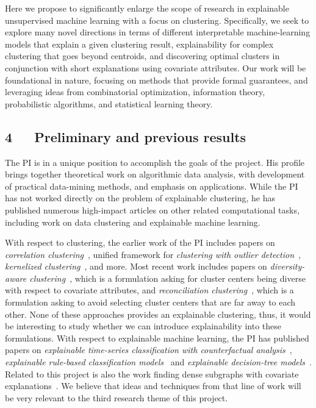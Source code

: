 \documentclass[a4paper,11pt]{article}
\begin{document}
Here we propose to significantly enlarge the scope of research in explainable unsupervised machine learning with a focus on clustering. 
Specifically, we seek to explore many novel directions in terms of
different interpretable machine-learning models that explain a given clustering result, 
explainability for complex clustering that goes beyond centroids, and 
discovering optimal clusters in conjunction with short explanations using covariate attributes. 
Our work will be foundational in nature, 
focusing on methods that provide formal guarantees, 
and leveraging ideas from combinatorial optimization, 
information theory, probabilistic algorithms, and statistical learning theory.

\subsection*{4~~~Preliminary and previous results}


The PI is in a unique position to accomplish the goals of the project. 
His profile brings together theoretical work on algorithmic data analysis, 
with development of practical data-mining methods, and emphasis on applications. 
While the PI has not worked directly on the problem of explainable clustering,
he has published numerous high-impact articles on other related computational tasks, 
including work on data clustering and explainable machine learning. 

With respect to clustering, 
the earlier work of the PI includes papers on
\emph{correlation clustering}~\cite{bonchi2013overlapping,gionis2007clustering},
unified framework for \emph{clustering with outlier detection}~\cite{chawla2013k},
\emph{kernelized clustering}~\cite{amid2015kernel}, and more.
Most recent work includes papers on
\emph{diversity-aware clustering}~\cite{thejaswi2021diversity}, 
which is a formulation asking for cluster centers being diverse with respect to covariate attributes, and
\emph{reconciliation clustering}~\cite{spoerhase2023constant}, 
which is a formulation asking to avoid selecting cluster centers that are far away to each other.
None of these approaches provides an explainable clustering, 
thus, it would be interesting to study whether we can introduce explainability
into these formulations.
%
With respect to explainable machine learning, 
the PI has published papers on 
\emph{explainable time-series classification with counterfactual analysis}~\cite{karlsson2020locally},
\emph{explainable rule-based classification models}~\cite{ciaperoni2023concise,zhang2020diverse}
and 
\emph{explainable decision-tree models}~\cite{zhang2023regularized}. 
Related to this project is also the work
finding dense subgraphs with covariate explanations~\cite{galbrun2014overlapping}.
We believe that ideas and techniques from that line of work
will be very relevant to the third research theme of this project.
\end{document}
